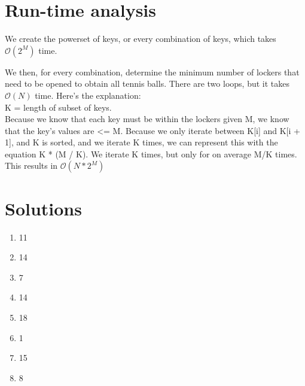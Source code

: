 \documentclass{article}
\begin{document}
\section*{Run-time analysis}
We create the powerset of keys, or every combination of keys, which takes
$\mathcal{O}(2^M)$ time.

We then, for every combination, determine the minimum number of lockers
that need to be opened to obtain all tennis balls. There are two loops, but
it takes $\mathcal{O}(N)$ time. Here's the explanation: \\ 

K = length of subset of keys. \\

Because we know that each key must be within the lockers given M, we know
that the key's values are <= M. Because we only iterate between K[i] and 
K[i + 1], and K is sorted, and we iterate K times, we can represent this with
the equation K * (M / K). We iterate K times, but only for on average M/K times. \\

This results in $\mathcal{O}(N*2^M)$ 

\section*{Solutions}
\begin{enumerate}
\setlength{\itemsep}{1pt}
\item 11
\item 14
\item 7
\item 14
\item 18
\item 1
\item 15
\item 8
\end{enumerate}
\end{document}
